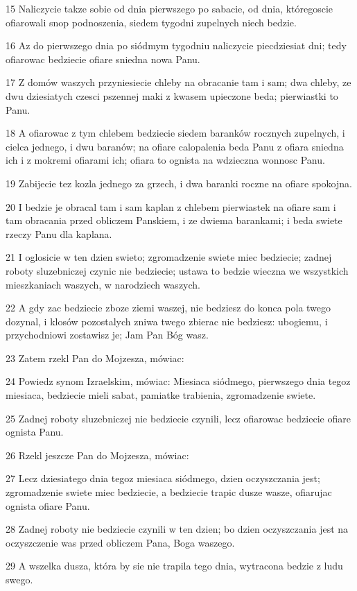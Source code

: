 \par 15 Naliczycie takze sobie od dnia pierwszego po sabacie, od dnia, któregoscie ofiarowali snop podnoszenia, siedem tygodni zupelnych niech bedzie.
\par 16 Az do pierwszego dnia po siódmym tygodniu naliczycie piecdziesiat dni; tedy ofiarowac bedziecie ofiare sniedna nowa Panu.
\par 17 Z domów waszych przyniesiecie chleby na obracanie tam i sam; dwa chleby, ze dwu dziesiatych czesci pszennej maki z kwasem upieczone beda; pierwiastki to Panu.
\par 18 A ofiarowac z tym chlebem bedziecie siedem baranków rocznych zupelnych, i cielca jednego, i dwu baranów; na ofiare calopalenia beda Panu z ofiara sniedna ich i z mokremi ofiarami ich; ofiara to ognista na wdzieczna wonnosc Panu.
\par 19 Zabijecie tez kozla jednego za grzech, i dwa baranki roczne na ofiare spokojna.
\par 20 I bedzie je obracal tam i sam kaplan z chlebem pierwiastek na ofiare sam i tam obracania przed obliczem Panskiem, i ze dwiema barankami; i beda swiete rzeczy Panu dla kaplana.
\par 21 I oglosicie w ten dzien swieto; zgromadzenie swiete miec bedziecie; zadnej roboty sluzebniczej czynic nie bedziecie; ustawa to bedzie wieczna we wszystkich mieszkaniach waszych, w narodziech waszych.
\par 22 A gdy zac bedziecie zboze ziemi waszej, nie bedziesz do konca pola twego dozynal, i klosów pozostalych zniwa twego zbierac nie bedziesz: ubogiemu, i przychodniowi zostawisz je; Jam Pan Bóg wasz.
\par 23 Zatem rzekl Pan do Mojzesza, mówiac:
\par 24 Powiedz synom Izraelskim, mówiac: Miesiaca siódmego, pierwszego dnia tegoz miesiaca, bedziecie mieli sabat, pamiatke trabienia, zgromadzenie swiete.
\par 25 Zadnej roboty sluzebniczej nie bedziecie czynili, lecz ofiarowac bedziecie ofiare ognista Panu.
\par 26 Rzekl jeszcze Pan do Mojzesza, mówiac:
\par 27 Lecz dziesiatego dnia tegoz miesiaca siódmego, dzien oczyszczania jest; zgromadzenie swiete miec bedziecie, a bedziecie trapic dusze wasze, ofiarujac ognista ofiare Panu.
\par 28 Zadnej roboty nie bedziecie czynili w ten dzien; bo dzien oczyszczania jest na oczyszczenie was przed obliczem Pana, Boga waszego.
\par 29 A wszelka dusza, która by sie nie trapila tego dnia, wytracona bedzie z ludu swego.
